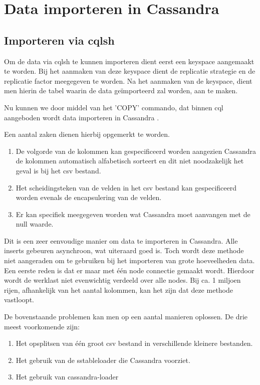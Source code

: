 \chapter{Data importeren in Cassandra}
\label{ch:cassandra_import}

\section{Importeren via cqlsh}
Om de data via cqlsh te kunnen importeren dient eerst een keyspace aangemaakt te worden.
Bij het aanmaken van deze keyspace dient de replicatie strategie en de replicatie factor meegegeven te worden.
Na het aanmaken van de keyspace, dient men hierin de tabel waarin de data geïmporteerd zal worden, aan te maken.

Nu kunnen we door middel van het 'COPY' commando, dat binnen cql aangeboden wordt data importeren in Cassandra \citep{Cannon2012Import}.

Een aantal zaken dienen hierbij opgemerkt te worden.

\begin{enumerate}
	\item De volgorde van de kolommen kan gespecificeerd worden aangezien Cassandra de kolommen automatisch alfabetisch sorteert en dit niet noodzakelijk het geval is bij het csv bestand.
	\item Het scheidingsteken van de velden in het csv bestand kan gespecificeerd worden evenals de encapsulering van de velden.
	\item Er kan specifiek meegegeven worden wat Cassandra moet aanvangen met de null waarde.
\end{enumerate}

Dit is een zeer eenvoudige manier om data te importeren in Cassandra.
Alle inserts gebeuren asynchroon, wat uiteraard goed is.
Toch wordt deze methode niet aangeraden om te gebruiken bij het importeren van grote hoeveelheden data.
Een eerste reden is dat er maar met één node connectie gemaakt wordt.
Hierdoor wordt de werklast niet evenwichtig verdeeld over alle nodes.
Bij ca. 1 miljoen rijen, afhankelijk van het aantal kolommen, kan het zijn dat deze methode vastloopt.

De bovenstaande problemen kan men op een aantal manieren oplossen.
De drie meest voorkomende zijn:

\begin{enumerate}
	\item Het opsplitsen van één groot csv bestand in verschillende kleinere bestanden.
	\item Het gebruik van de sstableloader die Cassandra voorziet.
	\item Het gebruik van cassandra-loader
\end{enumerate}

